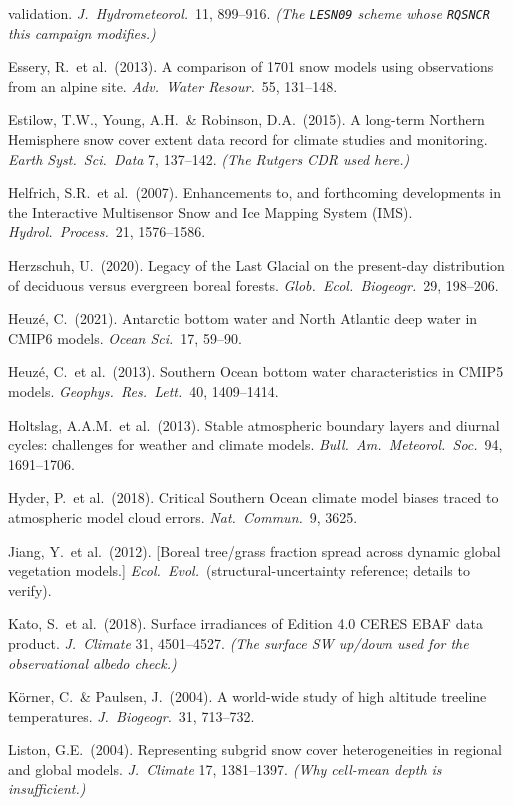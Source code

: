 \documentclass[10pt]{article}
\begin{document}
{validation. \emph{J.\ Hydrometeorol.}\ 11, 899--916. \emph{(The \texttt{LESN09} scheme whose \texttt{RQSNCR}
this campaign modifies.)}\par
Essery, R.\ et al.\ (2013). A comparison of 1701 snow models using observations from an alpine site.
\emph{Adv.\ Water Resour.}\ 55, 131--148.\par
Estilow, T.W., Young, A.H.\ \& Robinson, D.A.\ (2015). A long-term Northern Hemisphere snow cover extent data
record for climate studies and monitoring. \emph{Earth Syst.\ Sci.\ Data} 7, 137--142.
\emph{(The Rutgers CDR used here.)}\par
Helfrich, S.R.\ et al.\ (2007). Enhancements to, and forthcoming developments in the Interactive Multisensor
Snow and Ice Mapping System (IMS). \emph{Hydrol.\ Process.}\ 21, 1576--1586.\par
Herzschuh, U.\ (2020). Legacy of the Last Glacial on the present-day distribution of deciduous versus evergreen
boreal forests. \emph{Glob.\ Ecol.\ Biogeogr.}\ 29, 198--206.\par
Heuz\'e, C.\ (2021). Antarctic bottom water and North Atlantic deep water in CMIP6 models. \emph{Ocean Sci.}\ 17,
59--90.\par
Heuz\'e, C.\ et al.\ (2013). Southern Ocean bottom water characteristics in CMIP5 models. \emph{Geophys.\ Res.\
Lett.}\ 40, 1409--1414.\par
Holtslag, A.A.M.\ et al.\ (2013). Stable atmospheric boundary layers and diurnal cycles: challenges for weather and
climate models. \emph{Bull.\ Am.\ Meteorol.\ Soc.}\ 94, 1691--1706.\par
Hyder, P.\ et al.\ (2018). Critical Southern Ocean climate model biases traced to atmospheric model cloud errors.
\emph{Nat.\ Commun.}\ 9, 3625.\par
Jiang, Y.\ et al.\ (2012). [Boreal tree/grass fraction spread across dynamic global vegetation models.]
\emph{Ecol.\ Evol.}\ (structural-uncertainty reference; details to verify).\par
Kato, S.\ et al.\ (2018). Surface irradiances of Edition 4.0 CERES EBAF data product. \emph{J.\ Climate} 31,
4501--4527. \emph{(The surface SW up/down used for the observational albedo check.)}\par
K\"orner, C.\ \& Paulsen, J.\ (2004). A world-wide study of high altitude treeline temperatures. \emph{J.\
Biogeogr.}\ 31, 713--732.\par
Liston, G.E.\ (2004). Representing subgrid snow cover heterogeneities in regional and global models.
\emph{J.\ Climate} 17, 1381--1397. \emph{(Why cell-mean depth is insufficient.)}\par
}
\end{document}
